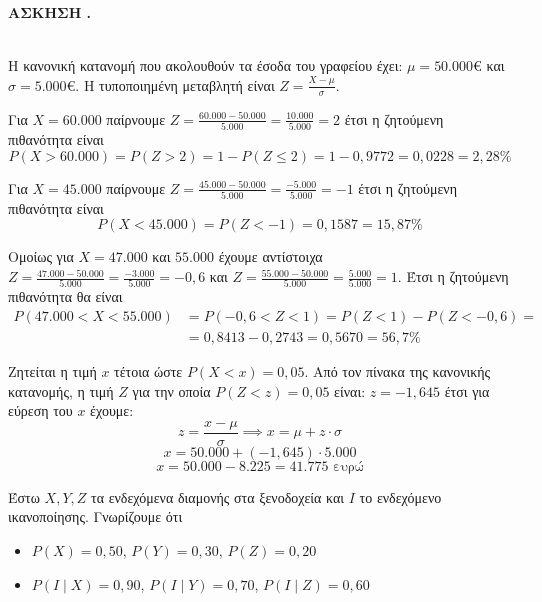 \documentclass[11pt,a4paper]{article}
\newcommand{\kerkissans}[1]{{\fontfamily{maksf}\selectfont \textbf{#1}}}
\newcounter{askhsh}
\newcommand{\askhsh}{\kerkissans{\Large{ΑΣΚΗΣΗ \theaskhsh.\\}}\ \addtocounter{askhsh}{1}}
\begin{document}
\askhsh\vspace{-5mm}
\begin{Alist}
\item 
Η κανονική κατανομή που ακολουθούν τα έσοδα του γραφείου έχει: $\mu = 50.000€$ και $\sigma = 5.000€$. Η τυποποιημένη μεταβλητή είναι $Z = \frac{X - \mu}{\sigma}$.
\begin{rlist}
\item Για $X=60.000$ παίρνουμε $Z=\frac{60.000-50.000}{5.000}=\frac{10.000}{5.000}=2$ έτσι η ζητούμενη πιθανότητα είναι
$$P(X > 60.000) = P(Z > 2) = 1 - P(Z \le 2) = 1 - 0,9772= 0,0228=2{,}28\%$$

\item Για $X=45.000$ παίρνουμε $Z=\frac{45.000-50.000}{5.000}=\frac{-5.000}{5.000}=-1$ έτσι η ζητούμενη πιθανότητα είναι
$$P(X < 45.000) =  P(Z < -1) = 0,1587=15{,}87\%$$

\item Ομοίως για $X=47.000$ και $55.000$ έχουμε αντίστοιχα $Z=\frac{47.000-50.000}{5.000}=\frac{-3.000}{5.000}=-0{,}6$ και $Z=\frac{55.000-50.000}{5.000}=\frac{5.000}{5.000}=1$. Έτσι η ζητούμενη πιθανότητα θα είναι
\begin{align*}
P(47.000 < X < 55.000) &= P(-0,6 < Z < 1) = P(Z < 1) - P(Z < -0,6)=\\&= 0,8413- 0,2743= 0,5670=56{,}7\%
\end{align*}

\item 
Ζητείται η τιμή $x$ τέτοια ώστε $P(X < x) = 0,05$.
Από τον πίνακα της κανονικής κατανομής, η τιμή $Z$ για την οποία $P(Z < z) = 0,05$ είναι: $z=-1,645$ έτσι για εύρεση του $x$ έχουμε:
$$z = \frac{x - \mu}{\sigma} \implies x = \mu + z \cdot \sigma$$
$$x = 50.000 + (-1,645) \cdot 5.000$$
$$x = 50.000 - 8.225 = 41.775 \text{ ευρώ}$$
\end{rlist}
\item Έστω $X, Y, Z$ τα ενδεχόμενα διαμονής στα ξενοδοχεία και $I$ το ενδεχόμενο ικανοποίησης.
Γνωρίζουμε ότι
\begin{itemize}
    \item $P(X) = 0,50$, $P(Y) = 0,30$, $P(Z) = 0,20$
    \item $P(I \mid X) = 0,90$, $P(I \mid Y) = 0,70$, $P(I \mid Z) = 0,60$
\end{itemize}
\begin{rlist}
\item 


\end{rlist}
\end{Alist}
\end{document}
